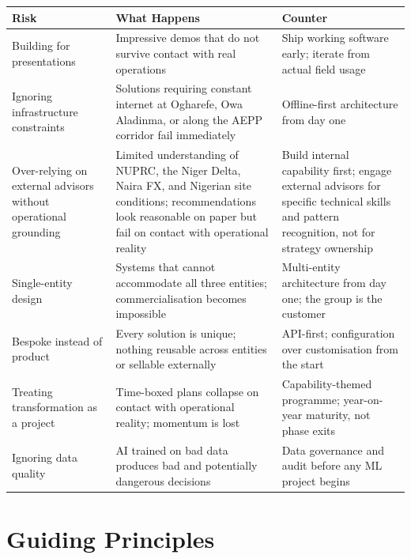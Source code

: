 \documentclass[10pt]{article}
\newcommand{\bigspacer}{\vspace{16pt}}
\begin{document}
\small
\begin{tabularx}{\columnwidth}{@{}lXX@{}}
\toprule
\textbf{Risk} & \textbf{What Happens} & \textbf{Counter} \\
\midrule
Building for presentations
  & Impressive demos that do not survive contact with real operations
  & Ship working software early; iterate from actual field usage \\
Ignoring infrastructure constraints
  & Solutions requiring constant internet at Ogharefe, Owa Aladinma, or
    along the AEPP corridor fail immediately
  & Offline-first architecture from day one \\
Over-relying on external advisors without operational grounding
  & Limited understanding of NUPRC, the Niger Delta, Naira FX, and Nigerian
    site conditions; recommendations look reasonable on paper but fail on
    contact with operational reality
  & Build internal capability first; engage external advisors for specific
    technical skills and pattern recognition, not for strategy ownership \\
Single-entity design
  & Systems that cannot accommodate all three entities; commercialisation
    becomes impossible
  & Multi-entity architecture from day one; the group is the customer \\
Bespoke instead of product
  & Every solution is unique; nothing reusable across entities or sellable
    externally
  & API-first; configuration over customisation from the start \\
Treating transformation as a project
  & Time-boxed plans collapse on contact with operational reality;
    momentum is lost
  & Capability-themed programme; year-on-year maturity, not phase exits \\
Ignoring data quality
  & AI trained on bad data produces bad and potentially dangerous
    decisions
  & Data governance and audit before any ML project begins \\
\bottomrule
\end{tabularx}
\normalsize

\bigspacer

\section{Guiding Principles}
\end{document}
